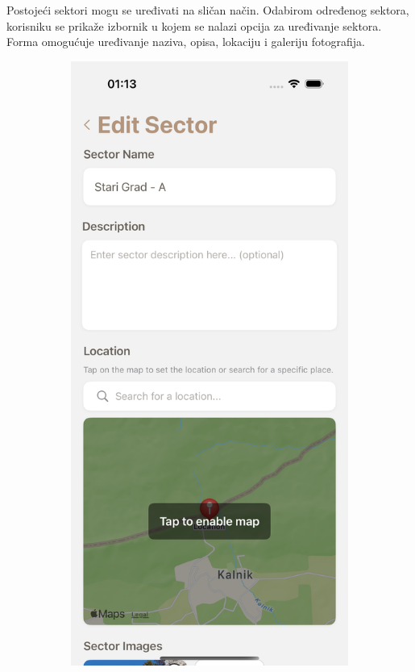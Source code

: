 Postojeći sektori mogu se uređivati na sličan način. Odabirom određenog sektora, korisniku se prikaže izbornik u kojem se nalazi opcija za uređivanje sektora. Forma omogućuje uređivanje  naziva, opisa, lokaciju i galeriju fotografija.

\begin{figure}[H]
    \centering
    \begin{subfigure}[b]{0.38\textwidth}
        \centering
        \includegraphics[width=\textwidth]{images/implementacija/editing-options/edit-sector.png}

\end{subfigure}
\end{figure}
